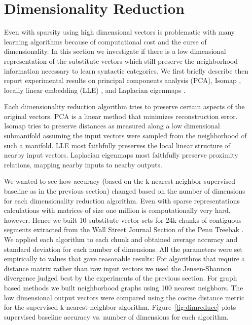 \section{Dimensionality Reduction}
\label{sec:dimreduce}

Even with sparsity using high dimensional vectors is problematic with
many learning algorithms because of computational cost and the curse
of dimensionality.  In this section we investigate if there is a low
dimensional representation of the substitute vectors which still
preserve the neighborhood information necessary to learn syntactic
categories.  We first briefly describe then report experimental
results on principal components analysis (PCA), Isomap
\cite{tenenbaum2000global}, locally linear embedding (LLE)
\cite{roweis2000nonlinear}, and Laplacian eigenmaps
\cite{belkin2003laplacian}.

Each dimensionality reduction algorithm tries to preserve certain
aspects of the original vectors.  PCA is a linear method that
minimizes reconstruction error.  Isomap tries to preserve distances as
measured along a low dimensional submanifold assuming the input
vectors were sampled from the neighborhood of such a manifold.  LLE
most faithfully preserves the local linear structure of nearby input
vectors.  Laplacian eigenmaps most faithfully preserve proximity
relations, mapping nearby inputs to nearby outputs.

We wanted to see how accuracy (based on the k-nearest-neighbor
supervised baseline as in the previous section) changed based on the
number of dimensions for each dimensionality reduction algorithm.  
%
Even with sparse representations calculations with matrices of size
one million is computationally very hard, however.  Hence we built 10
substitute vector sets for 24k chunks of contiguous segments extracted
from the Wall Street Journal Section of the Penn Treebak
\cite{treebank3}.  We applied each algorithm to each chunk and
obtained average accuracy and standard deviation for each number of
dimensions.
%
All the parameters were set empirically to values that gave
reasonable results: For algorithms that require a distance matrix
rather than raw input vectors we used the Jensen-Shannon divergence
judged best by the experiments of the previous section.  For graph
based methods we built neighborhood graphs using 100 nearest
neighbors.  The low dimensional output vectors were compared using the
cosine distance metric for the supervised k-nearest-neighbor
algorithm.  Figure~\ref{fig:dimreduce} plots supervised baseline
accuracy vs. number of dimensions for each algorithm.

